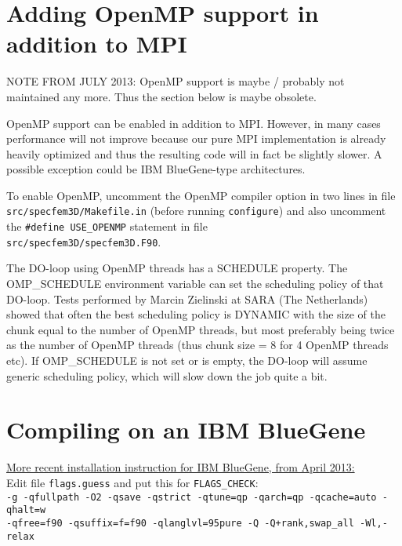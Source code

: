 \section{Adding OpenMP support in addition to MPI}

NOTE FROM JULY 2013: OpenMP support is maybe / probably not maintained any more.
Thus the section below is maybe obsolete.

OpenMP support can be enabled in addition to MPI. However, in many
cases performance will not improve because our pure MPI implementation
is already heavily optimized and thus the resulting code will in fact
be slightly slower. A possible exception could be IBM BlueGene-type
architectures.

To enable OpenMP, uncomment the OpenMP compiler option in two lines
in file \texttt{src/specfem3D/Makefile.in} (before running \texttt{configure})
and also uncomment the \texttt{\#define USE\_OPENMP} statement in
file\\
 \texttt{src/specfem3D/specfem3D.F90}.

The DO-loop using OpenMP threads has a SCHEDULE property. The OMP\_SCHEDULE
environment variable can set the scheduling policy of that DO-loop.
Tests performed by Marcin Zielinski at SARA (The Netherlands) showed
that often the best scheduling policy is DYNAMIC with the size of
the chunk equal to the number of OpenMP threads, but most preferably
being twice as the number of OpenMP threads (thus chunk size = 8 for
4 OpenMP threads etc). If OMP\_SCHEDULE is not set or is empty, the
DO-loop will assume generic scheduling policy, which will slow down
the job quite a bit.


\section{Compiling on an IBM BlueGene}

\underline{More recent installation instruction for IBM BlueGene, from April 2013:}\\


\noindent Edit file \texttt{flags.guess} and put this for \texttt{FLAGS\_CHECK}:\\


\noindent \texttt{-g -qfullpath -O2 -qsave -qstrict -qtune=qp -qarch=qp
-qcache=auto -qhalt=w}\\
 \texttt{-qfree=f90 -qsuffix=f=f90 -qlanglvl=95pure -Q -Q+rank,swap\_all
-Wl,-relax}\\


